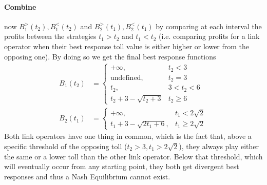 \documentclass[10pt,a4paper]{book}
\theoremstyle{definition}
\theoremstyle{comment}
\begin{document}
\paragraph{Combine} now $B_1^>(t_2), B_1^<(t_2)$ and $B_2^>(t_1), B_2^<(t_1)$ by comparing at each interval the profits between the strategies $t_1 > t_2$ and $t_1 < t_2$ (i.e. comparing profits for a link operator when their best response toll value is either higher or lower from the opposing one).
By doing so we get the final best response functions
\begin{align*}
	B_1(t_2) &=
	\begin{cases}
		+\infty, & t_2 < 3 \\
		\textrm{undefined}, & t_2 = 3 \\
		t_2, & 3 < t_2 < 6 \\
		t_2 + 3 - \sqrt{t_2 + 3} & t_2 \ge 6
	\end{cases} \\[10pt]
	B_2(t_1) &=
	\begin{cases}
		+\infty, & t_1 < 2 \sqrt{2} \\
		t_1 + 3 - \sqrt{2 t_1 + 6}, & t_1 \ge 2 \sqrt{2}
	\end{cases}
\end{align*}
Both link operators have one thing in common, which is the fact that, above a specific threshold of the opposing toll ($t_2 > 3, t_1 > 2 \sqrt{2}$), they always play either the same or a lower toll than the other link operator.
Below that threshold, which will eventually occur from any starting point, they both get divergent best responses and thus a Nash Equilibrium cannot exist.
\end{document}
